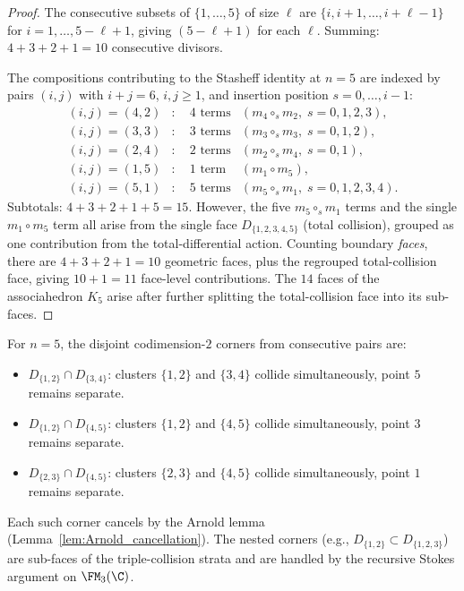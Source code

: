 \begin{proof}
The consecutive subsets of $\{1, \ldots, 5\}$ of size
$\ell$ are $\{i, i{+}1, \ldots, i{+}\ell{-}1\}$ for
$i = 1, \ldots, 5 - \ell + 1$, giving
$(5 - \ell + 1)$ for each $\ell$. Summing:
$4 + 3 + 2 + 1 = 10$ consecutive divisors.

The compositions contributing to the Stasheff identity
at $n = 5$ are indexed by pairs $(i, j)$ with
$i + j = 6$, $i, j \ge 1$, and insertion position
$s = 0, \ldots, i - 1$:
\begin{align*}
(i,j) = (4,2)&: \quad 4 \text{ terms}
 & (m_4 \circ_s m_2, \; s = 0,1,2,3), \\
(i,j) = (3,3)&: \quad 3 \text{ terms}
 & (m_3 \circ_s m_3, \; s = 0,1,2), \\
(i,j) = (2,4)&: \quad 2 \text{ terms}
 & (m_2 \circ_s m_4, \; s = 0,1), \\
(i,j) = (1,5)&: \quad 1 \text{ term}
 & (m_1 \circ m_5), \\
(i,j) = (5,1)&: \quad 5 \text{ terms}
 & (m_5 \circ_s m_1, \; s = 0,1,2,3,4).
\end{align*}
Subtotals: $4 + 3 + 2 + 1 + 5 = 15$.
However, the five $m_5 \circ_s m_1$ terms and the single
$m_1 \circ m_5$ term all arise from the single face
$D_{\{1,2,3,4,5\}}$ (total collision), grouped as one
contribution from the total-differential action. Counting
boundary \emph{faces}, there are
$4 + 3 + 2 + 1 = 10$ geometric faces, plus the
regrouped total-collision face, giving $10 + 1 = 11$
face-level contributions. The $14$ faces of the
associahedron $K_5$ arise after further splitting the
total-collision face into its sub-faces.
\end{proof}

\begin{remark}[Codimension-$2$ corners at $n = 5$]
For $n = 5$, the disjoint codimension-$2$ corners from
consecutive pairs are:
\begin{itemize}
\item $D_{\{1,2\}} \cap D_{\{3,4\}}$:
 clusters $\{1,2\}$ and $\{3,4\}$ collide simultaneously,
 point $5$ remains separate.
\item $D_{\{1,2\}} \cap D_{\{4,5\}}$:
 clusters $\{1,2\}$ and $\{4,5\}$ collide
 simultaneously, point $3$ remains separate.
\item $D_{\{2,3\}} \cap D_{\{4,5\}}$:
 clusters $\{2,3\}$ and $\{4,5\}$ collide
 simultaneously, point $1$ remains separate.
\end{itemize}
Each such corner cancels by the Arnold lemma
(Lemma~\ref{lem:Arnold_cancellation}). The nested
corners (e.g., $D_{\{1,2\}} \subset D_{\{1,2,3\}}$) are
sub-faces of the triple-collision strata and are handled
by the recursive Stokes argument on $\FM_3(\C)$.
\end{remark}

